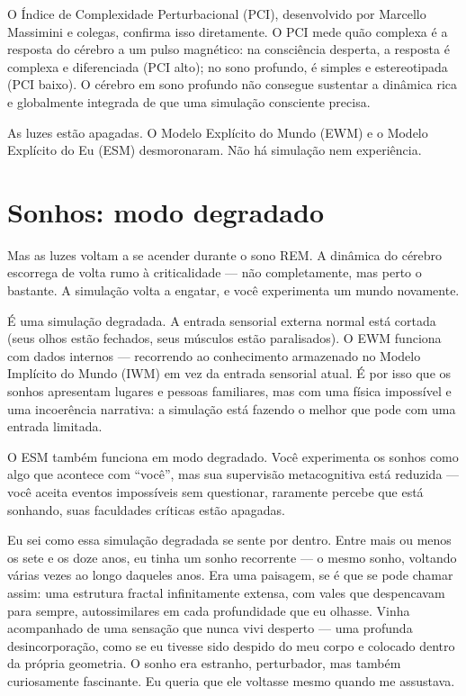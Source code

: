 \documentclass[11pt, twoside, openright]{book}
\begin{document}
O Índice de Complexidade Perturbacional (PCI), desenvolvido por Marcello Massimini e colegas, confirma isso diretamente. O PCI mede quão complexa é a resposta do cérebro a um pulso magnético: na consciência desperta, a resposta é complexa e diferenciada (PCI alto); no sono profundo, é simples e estereotipada (PCI baixo). O cérebro em sono profundo não consegue sustentar a dinâmica rica e globalmente integrada de que uma simulação consciente precisa.

As luzes estão apagadas. O Modelo Explícito do Mundo (EWM) e o Modelo Explícito do Eu (ESM) desmoronaram. Não há simulação nem experiência.

\section*{Sonhos: modo degradado}

Mas as luzes voltam a se acender durante o sono REM. A dinâmica do cérebro escorrega de volta rumo à criticalidade --- não completamente, mas perto o bastante. A simulação volta a engatar, e você experimenta um mundo novamente.

É uma simulação degradada. A entrada sensorial externa normal está cortada (seus olhos estão fechados, seus músculos estão paralisados). O EWM funciona com dados internos --- recorrendo ao conhecimento armazenado no Modelo Implícito do Mundo (IWM) em vez da entrada sensorial atual. É por isso que os sonhos apresentam lugares e pessoas familiares, mas com uma física impossível e uma incoerência narrativa: a simulação está fazendo o melhor que pode com uma entrada limitada.

O ESM também funciona em modo degradado. Você experimenta os sonhos como algo que acontece com ``você'', mas sua supervisão metacognitiva está reduzida --- você aceita eventos impossíveis sem questionar, raramente percebe que está sonhando, suas faculdades críticas estão apagadas.

Eu sei como essa simulação degradada se sente por dentro. Entre mais ou menos os sete e os doze anos, eu tinha um sonho recorrente --- o mesmo sonho, voltando várias vezes ao longo daqueles anos. Era uma paisagem, se é que se pode chamar assim: uma estrutura fractal infinitamente extensa, com vales que despencavam para sempre, autossimilares em cada profundidade que eu olhasse. Vinha acompanhado de uma sensação que nunca vivi desperto --- uma profunda desincorporação, como se eu tivesse sido despido do meu corpo e colocado dentro da própria geometria. O sonho era estranho, perturbador, mas também curiosamente fascinante. Eu queria que ele voltasse mesmo quando me assustava.
\end{document}
